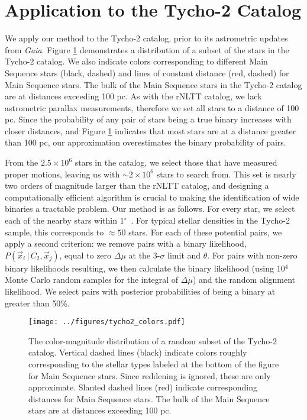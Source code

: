 \documentclass[usenatbib]{mnras}
\newcommand{\given}{\,|\,}
\newcommand{\degree}{\ifmmode {^\circ}\else$^\circ$\ \fi}
\begin{document}
\section{Application to the Tycho-2 Catalog}

We apply our method to the Tycho-2 catalog, prior to its astrometric updates from {\it Gaia}. Figure \ref{fig:tycho-2_color_mag} demonstrates a distribution of a subset of the stars in the Tycho-2 catalog. We also indicate colors corresponding to different Main Sequence stars (black, dashed) and lines of constant distance (red, dashed) for Main Sequence stars. The bulk of the Main Sequence stars in the Tycho-2 catalog are at distances exceeding 100 pc. As with the rNLTT catalog, we lack astrometric parallax measurements, therefore we set all stars to a distance of 100 pc. Since the probability of any pair of stars being a true binary increases with closer distances, and Figure \ref{fig:tycho-2_color_mag} indicates that most stars are at a distance greater than 100 pc, our approximation overestimates the binary probability of pairs.


From the $2.5\times10^6$ stars in the catalog, we select those that have measured proper motions, leaving us with $\sim2\times10^6$ stars to search from. This set is nearly two orders of magnitude larger than the rNLTT catalog, and designing a computationally efficient algorithm is crucial to making the identification of wide binaries a tractable problem. Our method is as follows. For every star, we select each of the nearby stars within 1\degree. For typical stellar densities in the Tycho-2 sample, this corresponds to $\approx50$ stars. For each of these potential pairs, we apply a second criterion: we remove pairs with a binary likelihood, $P(\vec{x}_i \given C_2, \vec{x}_j)$, equal to zero $\Delta \mu$ at the 3-$\sigma$ limit and $\theta$. For pairs with non-zero binary likelihoods resulting, we then calculate the binary likelihood (using 10$^4$ Monte Carlo random samples for the integral of $\Delta \mu$) and the random alignment likelihood. We select pairs with posterior probabilities of being a binary at greater than 50\%.
 
 
 
\begin{figure}
\begin{center}
\texttt{[image: ../figures/tycho2\_colors.pdf]}
\caption{ The color-magnitude distribution of a random subset of the Tycho-2 catalog. Vertical dashed lines (black) indicate colors roughly corresponding to the stellar types labeled at the bottom of the figure for Main Sequence stars. Since reddening is ignored, these are only approximate. Slanted dashed lines (red) indicate corresponding distances for Main Sequence stars. The bulk of the Main Sequence stars are at distances exceeding 100 pc.}
\label{fig:tycho-2_color_mag}
\end{center}
\end{figure}
\end{document}

